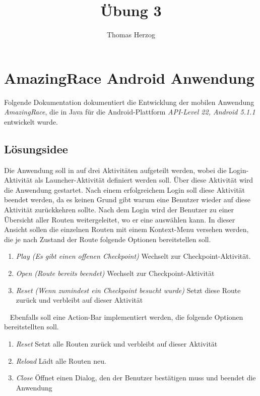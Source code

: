 \documentclass[11pt, a4paper, twoside]{article}   	%
\title{Übung 3}
\author{Thomas Herzog}
\begin{document}
\setlength{\headheight}{15mm}
%
{\color{myred}
	\section
		{AmazingRace Android Anwendung}
}
Folgende Dokumentation dokumentiert die Entwicklung der mobilen Anwendung \emph{AmazingRace}, die in Java für die Android-Plattform \emph{API-Level 22, Android 5.1.1} entwickelt wurde.
\newline

\subsection{Lösungsidee}
Die Anwendung soll in auf drei Aktivitäten aufgeteilt werden, wobei die Login-Aktivität als Launcher-Aktivität definiert werden soll. Über diese Aktivität wird die Anwendung gestartet. Nach einem erfolgreichem Login soll diese Aktivität beendet werden, da es keinen Grund gibt warum eine Benutzer wieder auf diese Aktivität zurückkehren sollte.
\newline
\newline
Nach dem Login wird der Benutzer zu einer Übersicht aller Routen weitergeleitet, wo er eine auswählen kann. In dieser Ansicht sollen die einzelnen Routen mit einem Kontext-Menu versehen werden, die je nach Zustand der Route folgende Optionen bereitstellen soll.
\begin{enumerate}
	\item\emph{Play (Es gibt einen offenen Checkpoint)}
	\newline
	Wechselt zur Checkpoint-Aktivität.
	\item\emph{Open (Route bereits beendet)}
	\newline
	Wechselt zur Checkpoint-Aktivität
	\item\emph{Reset (Wenn zumindest ein Checkpoint besucht wurde)}
	\newline
	Setzt diese Route zurück und verbleibt auf dieser Aktivität	
\end{enumerate}
\ \newline
Ebenfalls soll eine Action-Bar implementiert werden, die folgende Optionen bereitstellten soll.
\begin{enumerate}
	\item\emph{Reset}
	\newline
	Setzt alle Routen zurück und verbleibt auf dieser Aktivität
	\item\emph{Reload}
	\newline
	Lädt alle Routen neu.
	\item\emph{Close}
	\newline
	Öffnet einen Dialog, den der Benutzer bestätigen muss und beendet die Anwendung
\end{enumerate} 
\end{document}
